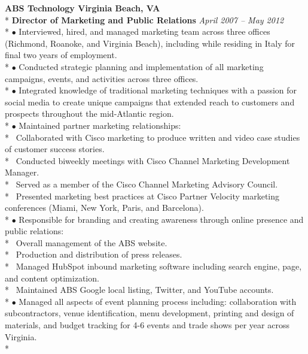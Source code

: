\documentclass{article}
\begin{document}
\noindent \textbf{ABS Technology \hfill Virginia Beach, VA} \\*
\textbf{Director of Marketing and Public Relations} \hfill \textit{April 2007 -- May 2012} \\*
\noindent $\bullet$ Interviewed, hired, and managed marketing team across three offices (Richmond, Roanoke, and Virginia Beach), including while residing in Italy for final two years of employment.\\*
\noindent $\bullet$ Conducted strategic planning and implementation of all marketing campaigns, events, and activities across three offices.\\*
\noindent $\bullet$ Integrated knowledge of traditional marketing techniques with a passion for social media to create unique campaigns that extended reach to customers and prospects throughout the mid-Atlantic region.\\*
\noindent $\bullet$ Maintained partner marketing relationships:\\*
\indent \textendash\ Collaborated with Cisco marketing to produce written and video case studies of customer success stories.\\*
\indent \textendash\ Conducted biweekly meetings with Cisco Channel Marketing Development Manager.\\*
\indent \textendash\ Served as a member of the Cisco Channel Marketing Advisory Council.\\*
\indent \textendash\ Presented marketing best practices at Cisco Partner Velocity marketing conferences (Miami, New York, Paris, and Barcelona).\\*
\noindent $\bullet$ Responsible for branding and creating awareness through online presence and public relations:\\*
\indent \textendash\ Overall management of the ABS website.\\*
\indent \textendash\ Production and distribution of press releases.\\*
\indent \textendash\ Managed HubSpot inbound marketing software including search engine, page, and content optimization.\\*
\indent \textendash\ Maintained ABS Google local listing, Twitter, and YouTube accounts.\\*
\noindent $\bullet$ Managed all aspects of event planning process including: collaboration with subcontractors, venue identification, menu development, printing and design of materials, and budget tracking for 4-6 events and trade shows
per year across Virginia.\\*
\end{document}
